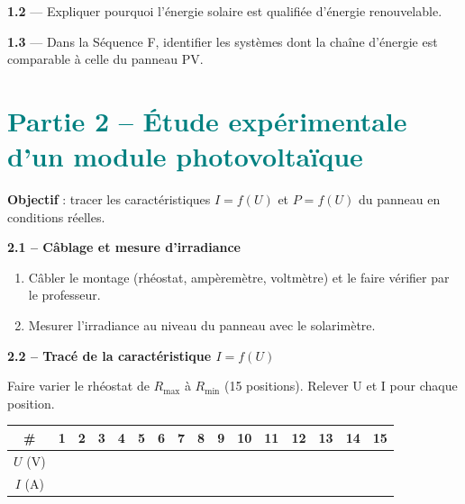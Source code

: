 \documentclass[a4paper, 11pt, oneside]{article}
\newcommand{\question}[1]{\textcolor{bleucol}{\textbf{#1}}}
\begin{document}
\vspace{0.6cm}
\textbf{1.2} --- Expliquer pourquoi l'énergie solaire est qualifiée d'énergie renouvelable.

\vspace{1.5cm}

\textbf{1.3} --- Dans la Séquence F, identifier les systèmes dont la chaîne d'énergie est comparable à celle du panneau PV.

\vspace{1.5cm}

\newpage

\section{\textcolor{teal}{Partie 2 -- Étude expérimentale d'un module photovoltaïque}}

\textbf{Objectif} : tracer les caractéristiques $I = f(U)$ et $P = f(U)$ du panneau en conditions réelles.

\vspace{0.6cm}

\question{2.1 -- Câblage et mesure d'irradiance}

\begin{enumerate}
  \item Câbler le montage (rhéostat, ampèremètre, voltmètre) et le faire vérifier par le professeur.
  \item Mesurer l'irradiance au niveau du panneau avec le solarimètre.
\end{enumerate}


\vspace{0.8cm}

\question{2.2 -- Tracé de la caractéristique $I = f(U)$}

Faire varier le rhéostat de $R_{\max}$ à $R_{\min}$ (15 positions). Relever U et I pour chaque position.

\vspace{0.3cm}

{\small
\begin{tabular}{|c|c|c|c|c|c|c|c|c|c|c|c|c|c|c|c|}
\hline
\# & 1 & 2 & 3 & 4 & 5 & 6 & 7 & 8 & 9 & 10 & 11 & 12 & 13 & 14 & 15 \\
\hline
$U$ (V) & & & & & & & & & & & & & & & \\[8pt]
\hline
$I$ (A) & & & & & & & & & & & & & & & \\[8pt]
\hline
\end{tabular}
}
\end{document}
